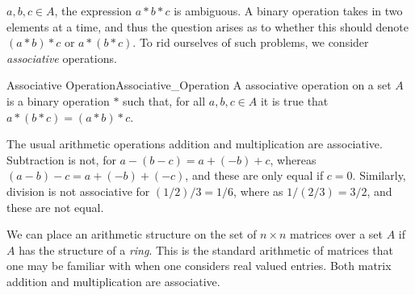     $a,b,c\in{A}$, the expression $a*b*c$ is ambiguous. A binary operation takes
    in two elements at a time, and thus the question arises as to whether this
    should denote $(a*b)*c$ or $a*(b*c)$. To rid ourselves of such problems, we
    consider \textit{associative} operations.
    \begin{fdefinition}{Associative Operation}{Associative_Operation}
        A \gls{associative operation} on a \gls{set} $A$ is a
        \gls{binary operation} $*$ such that, for all $a,b,c\in{A}$ it is true
        that $a*(b*c)=(a*b)*c$.
    \end{fdefinition}
    \begin{example}
        The usual arithmetic operations addition and multiplication are
        associative. Subtraction is not, for $a-(b-c)=a+(\minus{b})+c$, whereas
        $(a-b)-c=a+(\minus{b})+(\minus{c})$, and these are only equal if $c=0$.
        Similarly, division is not associative for $(1/2)/3=1/6$, where as
        $1/(2/3)=3/2$, and these are not equal.
    \end{example}
    \begin{example}
        We can place an arithmetic structure on the set of $n\times{n}$ matrices
        over a set $A$ if $A$ has the structure of a \textit{ring}. This is the
        standard arithmetic of matrices that one may be familiar with when one
        considers real valued entries. Both matrix addition and multiplication
        are associative.
    \end{example}
